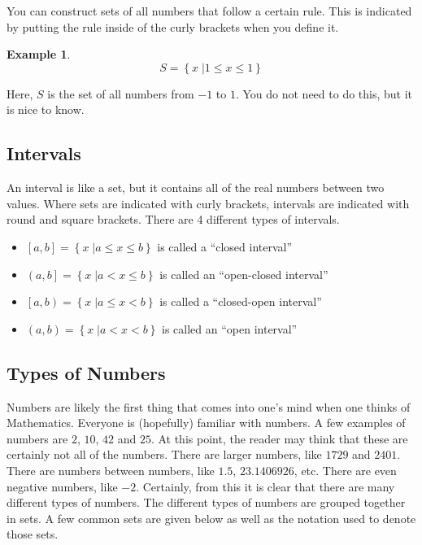 \documentclass[a4paper,12pt]{article}
\newtheorem{example}{Example}[section]
\begin{document}
You can construct sets of all numbers that follow a certain rule. This is indicated by putting the rule inside of the curly brackets when you define it.
\begin{example}
$$S = \left\{x\; | 1 \le x \le 1\right\}$$
\end{example}
Here, $S$ is the set of all numbers from $-1$ to $1$. You do not need to do this, but it is nice to know.

\subsection{Intervals}
An interval is like a set, but it contains all of the real numbers between two values. Where sets are indicated with curly brackets, intervals are indicated with round and square brackets. There are 4 different types of intervals.
\begin{itemize}
    \item $\left[a, b\right] = \left\{x\; | a \le x \le b\right\}$ is called a ``closed interval''
    \item $\left(a, b\right] = \left\{x\; | a < x \le b\right\}$ is called an ``open-closed interval''
    \item $\left[a, b\right) = \left\{x\; | a \le x < b\right\}$ is called a ``closed-open interval''
    \item $\left(a, b\right) = \left\{x\; | a < x < b\right\}$ is called an ``open interval''
\end{itemize}

\subsection{Types of Numbers}

Numbers are likely the first thing that comes into one's mind when one thinks of Mathematics. Everyone is (hopefully) familiar with numbers. A few examples of numbers are $2$, $10$, $42$ and $25$. At this point, the reader may think that these are certainly not all of the numbers. There are larger numbers, like $1729$ and $2401$. There are numbers between numbers, like $1.5$, $23.1406926$, etc. There are even negative numbers, like $-2$. Certainly, from this it is clear that there are many different types of numbers. The different types of numbers are grouped together in sets. A few common sets are given below as well as the notation used to denote those sets.
\end{document}
